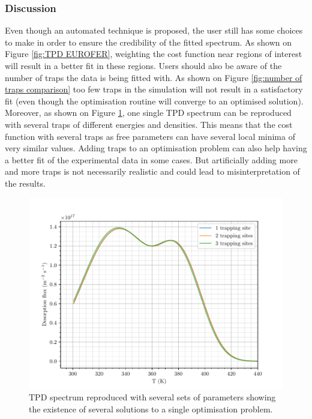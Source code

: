 \subsubsection{Discussion}

Even though an automated technique is proposed, the user still has some choices to make in order to ensure the credibility of the fitted spectrum.
As shown on Figure \ref{fig:TPD EUROFER}, weighting the cost function near regions of interest will result in a better fit in these regions.
Users should also be aware of the number of traps the data is being fitted with.
As shown on Figure \ref{fig:number of traps comparison} too few traps in the simulation will not result in a satisfactory fit (even though the optimisation routine will converge to an optimised solution).
Moreover, as shown on Figure \ref{fig:hurley_comparison}, one single TPD spectrum can be reproduced with several traps of different energies and densities.
This means that the cost function with several traps as free parameters can have several local minima of very similar values.
Adding traps to an optimisation problem can also help having a better fit of the experimental data in some cases.
But artificially adding more and more traps is not necessarily realistic and could lead to misinterpretation of the results.

\begin{figure}[ht]
    \centering
    \includegraphics[width=\linewidth]{Figures/Chapter3/Parametric_optimisation/hurley_comparison.pdf}
    \caption{TPD spectrum reproduced with several sets of parameters showing the existence of several solutions to a single optimisation problem.}
    \label{fig:hurley_comparison}
\end{figure}

